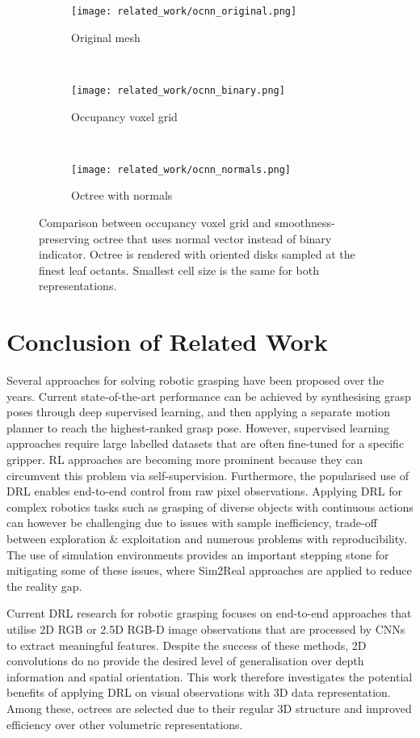 \begin{figure}[ht]
    \centering
    \begin{subfigure}[ht]{0.325\textwidth}
        \centering
        \texttt{[image: related\_work/ocnn\_original.png]}
        \caption*{Original mesh}
    \end{subfigure}%
    ~
    \begin{subfigure}[ht]{0.325\textwidth}
        \centering
        \texttt{[image: related\_work/ocnn\_binary.png]}
        \caption*{Occupancy voxel grid}
    \end{subfigure}%
    ~
    \begin{subfigure}[ht]{0.325\textwidth}
        \centering
        \texttt{[image: related\_work/ocnn\_normals.png]}
        \caption*{Octree with normals}
    \end{subfigure}%
    \caption{Comparison between occupancy voxel grid and smoothness-preserving octree that uses normal vector instead of binary indicator. Octree is rendered with oriented disks sampled at the finest leaf octants. Smallest cell size is the same for both representations. \protect\cite{wang_o-cnn_2017}}
    \label{fig:rw_ocnn_occupancy_vs_normals}
\end{figure}


\section*{Conclusion of Related Work}

Several approaches for solving robotic grasping have been proposed over the years. Current state-of-the-art performance can be achieved by synthesising grasp poses through deep supervised learning, and then applying a separate motion planner to reach the highest-ranked grasp pose. However, supervised learning approaches require large labelled datasets that are often fine-tuned for a specific gripper. RL approaches are becoming more prominent because they can circumvent this problem via self-supervision. Furthermore, the popularised use of DRL enables end-to-end control from raw pixel observations. Applying DRL for complex robotics tasks such as grasping of diverse objects with continuous actions can however be challenging due to issues with sample inefficiency, trade-off between exploration \& exploitation and numerous problems with reproducibility. The use of simulation environments provides an important stepping stone for mitigating some of these issues, where Sim2Real approaches are applied to reduce the reality gap.

Current DRL research for robotic grasping focuses on end-to-end approaches that utilise 2D RGB or 2.5D RGB-D image observations that are processed by CNNs to extract meaningful features. Despite the success of these methods, 2D convolutions do no provide the desired level of generalisation over depth information and spatial orientation. This work therefore investigates the potential benefits of applying DRL on visual observations with 3D data representation. Among these, octrees are selected due to their regular 3D structure and improved efficiency over other volumetric representations.
